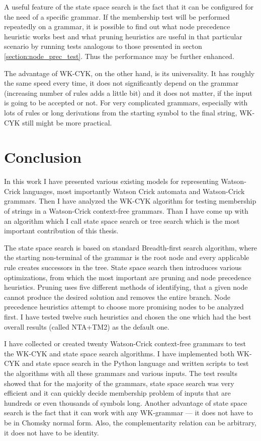 A useful feature of the state space search is the fact that it can be configured for the need of a specific grammar. If the membership test will be performed repeatedly on a grammar, it is possible to find out what node precedence heuristic works best and what pruning heuristics are useful in that particular scenario by running tests analogous to those presented in secton \ref{section:node_prec_test}. Thus the performance may be further enhanced.

The advantage of WK-CYK, on the other hand, is its universality. It has roughly the same speed every time, it does not significantly depend on the grammar (increasing number of rules adds a little bit) and it does not matter, if the input is going to be accepted or not. For very complicated grammars, especially with lots of rules or long derivations from the starting symbol to the final string, WK-CYK still might be more practical.

\chapter{Conclusion}
In this work I have presented various existing models for representing Watson-Crick languages, most importantly Watson Crick automata and Watson-Crick grammars. Then I have analyzed the WK-CYK algorithm for testing membership of strings in a Watson-Crick context-free grammars. Than I have come up with an algorithm which I call state space search or tree search which is the most important contribution of this thesis.

The state space search is based on standard Breadth-first search algorithm, where the starting non-terminal of the grammar is the root node and every applicable rule creates successors in the tree. State space search then introduces various optimizations, from which the most important are pruning and node precedence heuristics. Pruning uses five different methods of identifying, that a given node cannot produce the desired solution and removes the entire branch. Node precedence heuristics attempt to choose more promising nodes to be analyzed first. I have tested twelve such heuristics and chosen the one which had the best overall results (called NTA+TM2) as the default one.

I have collected or created twenty Watson-Crick context-free grammars to test the WK-CYK and state space search algorithms.
I have implemented both WK-CYK and state space search in the Python language and written scripts to test the algorithms with all these grammars and various inputs. The test results showed that for the majority of the grammars, state space search was very efficient and it can quickly decide membership problem of inputs that are hundreds or even thousands of symbols long. Another advantage of state space search is the fact that it can work with any WK-grammar --- it does not have to be in Chomsky normal form. Also, the complementarity relation can be arbitrary, it does not have to be identity.

